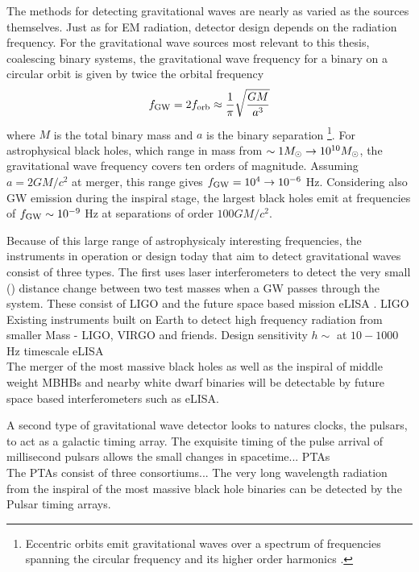 The methods for detecting gravitational waves are nearly as varied as the sources themselves. Just as for EM radiation, detector design depends on the radiation frequency. For the gravitational wave sources most relevant to this thesis, coalescing binary systems, the gravitational wave frequency for a binary on a circular orbit is given by twice the orbital frequency
\begin{equation}
f_{\rm{GW}} = 2 f_{\rm{orb}} \approx  \frac{1}{\pi} \sqrt{\frac{G M }{a^3}}
\end{equation}
where $M$ is the total binary mass and $a$ is the binary separation \footnote{Eccentric orbits emit gravitational waves over a spectrum of frequencies spanning the circular frequency and its higher order harmonics \citep{}.}.  For astrophysical black holes, which range in mass from $\sim 1 {M_{\odot}} \rightarrow 10^{10} {M_{\odot}}$, the gravitational wave frequency covers ten orders of magnitude. Assuming $a = 2GM/c^2$ at merger, this range gives $f_{\rm{GW}} = 10^4 \rightarrow 10^{-6}$ Hz. Considering also GW emission during the inspiral stage, the largest black holes emit at frequencies of $f_{\rm{GW}} \sim 10^{-9}$ Hz at separations of order $100 GM/c^2$.

Because of this large range of astrophysicaly interesting frequencies, the instruments in operation or design today that aim to detect gravitational waves consist of three types. The first uses laser interferometers to detect the very small () distance change between two test masses when a GW passes through the system. These consist of LIGO \citep{} and the future space based mission eLISA \citep{}. 
LIGO\\
Existing instruments built on Earth to detect high frequency radiation from smaller Mass - LIGO, VIRGO and friends. 
Design sensitivity $h \sim$ at $10 -1000$ Hz
timescale
eLISA\\
The merger of the most massive black holes as well as the inspiral of middle weight MBHBs and nearby white dwarf binaries will be detectable by future space based interferometers such as eLISA.


A second type of gravitational wave detector looks to natures clocks, the pulsars, to act as a galactic timing array. The exquisite timing of the pulse arrival of millisecond pulsars allows the small changes in spacetime... 
PTAs\\
The PTAs consist of three consortiums...
The very long wavelength radiation from the inspiral of the most massive black hole binaries can be detected by the Pulsar timing arrays.


